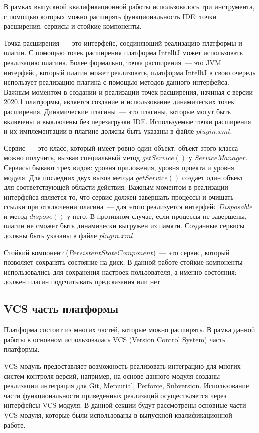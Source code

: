 В рамках выпускной квалификационной работы использовалось три инструмента, с помощью которых можно расширять функциональность IDE: точки расширения, сервисы и стойкие компоненты.

Точка расширения~--- это интерфейс, соединяющий реализацию платформы и плагин. С помощью точек расширения платформа IntelliJ может использовать реализацию плагина. Более формально, точка расширения~--- это JVM интерфейс, который плагин может реализовать, платформа IntelliJ в свою очередь использует реализацию плагина с помощью методов данного интерфейса. Важным моментом в создании и реализации точек расширения, начиная с версии 2020.1 платформы, является создание и использование динамических точек расширения. Динамические плагины~--- это плагины, которые могут быть включены и выключены без перезагрузки IDE. Используемые точки расширения и их имплементации в плагине должны быть указаны в файле $plugin.xml$.

Сервис~--- это класс, который имеет ровно один объект, объект этого класса можно получить, вызвав специальный метод $getService()$ у $ServiceManager$. Сервисы бывают трех видов: уровня приложения, уровня проекта и уровня модуля. Для последних двух вызов метода $getService()$ создает один объект для соответствующей области действия. Важным моментом в реализации интерфейса является то, что сервис должен завершать процессы и очищать ссылки при отключении плагина~--- для этого реализуется интерфейс $Disposable$ и метод $dispose()$ у него. В противном случае, если процессы не завершены, плагин не сможет быть динамически выгружен из памяти. Созданные сервисы должны быть указаны в файле $plugin.xml$.

Стойкий компонент ($PersistentStateComponent$)~--- это сервис, который позволяет сохранять состояние на диск. В данной работе стойкие компоненты использовались для сохранения настроек пользователя, а именно состояния: должен плагин подсчитывать предсказания или нет.
    \subsection{VCS часть платформы}\label{chapter2-vcs}
Платформа состоит из многих частей, которые можно расширять. В рамка данной работы в основном использовалась VCS (Version Control System) часть платформы.

VCS модуль предоставляет возможность реализовать интеграцию для многих систем контроля версий, например, на основе данного модуля созданы реализации интеграция для Git, Mercurial, Perforce, Subversion. Использование части функциональности приведенных реализаций осуществляется через интерфейсы VCS модуля. В данной секции будут рассмотрены основные части VCS модуля, которые были использованы в выпускной квалификационной работе.

